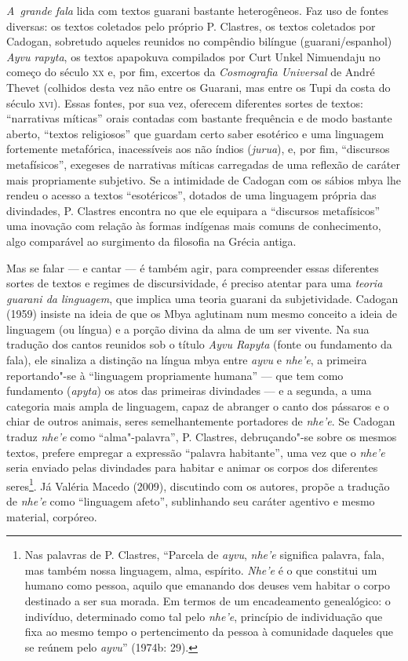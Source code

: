 \emph{A~grande fala} lida com textos guarani bastante heterogêneos. Faz uso de
fontes diversas: os textos coletados pelo próprio P. Clastres, os
textos coletados por Cadogan, sobretudo aqueles reunidos no compêndio
bilíngue (guarani/espanhol) \emph{Ayvu rapyta}, os textos apapokuva compilados
por Curt Unkel Nimuendaju no começo do século \textsc{xx} e, por fim, excertos
da \emph{Cosmografia Universal} de André Thevet (colhidos desta vez não entre
os Guarani, mas entre os Tupi da costa do século \textsc{xvi}). Essas fontes,
por sua vez, oferecem diferentes sortes de textos: ``narrativas míticas''
orais contadas com bastante frequência e de modo bastante aberto,
``textos religiosos'' que guardam certo saber esotérico e uma linguagem
fortemente metafórica, inacessíveis aos não índios (\emph{jurua}), e, por fim,
``discursos metafísicos'', exegeses de narrativas míticas carregadas de
uma reflexão de caráter mais propriamente subjetivo. Se a intimidade de
Cadogan com os sábios mbya lhe rendeu o acesso a textos ``esotéricos'',
dotados de uma linguagem própria das divindades, P. Clastres encontra
no que ele equipara a ``discursos metafísicos'' uma inovação com relação
às formas indígenas mais comuns de conhecimento, algo comparável ao
surgimento da filosofia na Grécia antiga.

Mas se falar --- e cantar --- é também agir, para compreender essas
diferentes sortes de textos e regimes de discursividade, é preciso
atentar para uma \emph{teoria guarani da linguagem}, que implica uma teoria
guarani da subjetividade. Cadogan (1959) insiste na ideia de que os
Mbya aglutinam num mesmo conceito a ideia de linguagem (ou língua) e a
porção divina da alma de um ser vivente. Na sua tradução dos cantos
reunidos sob o título \emph{Ayvu Rapyta} (fonte ou fundamento da fala), ele
sinaliza a distinção na língua mbya entre \emph{ayvu} e \emph{nhe’e}, a primeira
reportando"-se à ``linguagem propriamente humana'' --- que tem como
fundamento (\emph{apyta}) os atos das primeiras divindades --- e a segunda, a
uma categoria mais ampla de linguagem, capaz de abranger o canto dos
pássaros e o chiar de outros animais, seres semelhantemente portadores
de \emph{nhe’e}. Se Cadogan traduz \emph{nhe’e} como ``alma"-palavra'', P. Clastres,
debruçando"-se sobre os mesmos textos, prefere empregar a expressão
``palavra habitante'', uma vez que o \emph{nhe’e} seria enviado pelas divindades
para habitar e animar os corpos dos diferentes seres\footnote{Nas
palavras de P. Clastres, ``Parcela de \emph{ayvu}, \emph{nhe’e} significa palavra,
fala, mas também nossa linguagem, alma, espírito. \emph{Nhe’e} é o que
constitui um humano como pessoa, aquilo que emanando dos deuses vem
habitar o corpo destinado a ser sua morada. Em termos de um
encadeamento genealógico: o indivíduo, determinado como tal pelo \emph{nhe’e},
princípio de individuação que fixa ao mesmo tempo o pertencimento da
pessoa à comunidade daqueles que se reúnem pelo \emph{ayvu}'' (1974b: 29).}. Já
Valéria Macedo (2009), discutindo com os autores, propõe a tradução de
\emph{nhe’e} como ``linguagem afeto'', sublinhando seu caráter agentivo e mesmo
material, corpóreo. 

